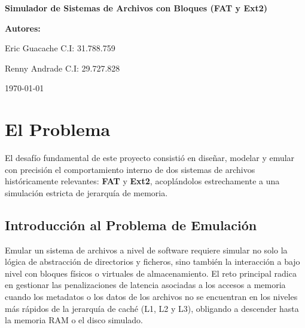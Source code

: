 \documentclass[12pt,a4paper]{article}
\begin{document}
	
	\begin{titlepage}
		\centering
		\vspace*{4cm}
		
		{\Huge \textbf{Simulador de Sistemas de Archivos con Bloques (FAT y Ext2)}\par}
		
		\vspace{3cm}
		
		{\large \textbf{Autores:}\par}
		\vspace{0.5cm}
		{Eric Guacache \quad C.I: 31.788.759\par}
		{Renny Andrade \quad C.I: 29.727.828\par}
		
		\vfill
		
		{\large \today\par}
	\end{titlepage}
	
	\newpage
	
	\tableofcontents
	\newpage
	
	\section{El Problema}
	El desafío fundamental de este proyecto consistió en diseñar, modelar y emular con precisión el comportamiento interno de dos sistemas de archivos históricamente relevantes: \textbf{FAT} y \textbf{Ext2}, acoplándolos estrechamente a una simulación estricta de jerarquía de memoria. 
	
	\subsection{Introducción al Problema de Emulación}
	Emular un sistema de archivos a nivel de software requiere simular no solo la lógica de abstracción de directorios y ficheros, sino también la interacción a bajo nivel con bloques físicos o virtuales de almacenamiento. El reto principal radica en gestionar las penalizaciones de latencia asociadas a los accesos a memoria cuando los metadatos o los datos de los archivos no se encuentran en los niveles más rápidos de la jerarquía de caché (L1, L2 y L3), obligando a descender hasta la memoria RAM o el disco simulado.
	
\end{document}
